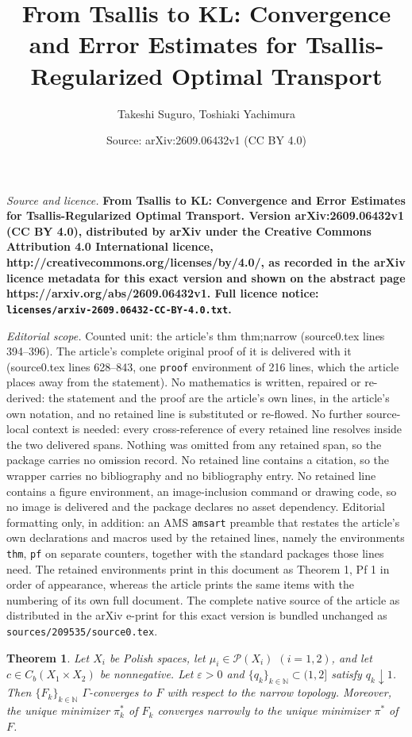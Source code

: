 \documentclass[10pt,a4paper]{amsart}
\title{\bf From Tsallis to KL: Convergence and Error Estimates for Tsallis-Regularized Optimal Transport}
\author{Takeshi Suguro, Toshiaki Yachimura}
\date{Source: arXiv:2609.06432v1 (CC BY 4.0)}
\newtheorem{thm}{Theorem}
\newcommand{\N}{\mathbb N}
\newcommand{\ep}{\varepsilon}
\begin{document}
\maketitle

\noindent\emph{Source and licence.} \bf From Tsallis to KL: Convergence and Error Estimates for Tsallis-Regularized Optimal Transport. Version arXiv:2609.06432v1 (CC BY 4.0), distributed by arXiv under the Creative Commons Attribution 4.0 International licence, http://creativecommons.org/licenses/by/4.0/, as recorded in the arXiv licence metadata for this exact version and shown on the abstract page https://arxiv.org/abs/2609.06432v1. Full licence notice: \texttt{licenses/arxiv-2609.06432-CC-BY-4.0.txt}.\par\smallskip

\noindent\textit{Editorial scope.} Counted unit: the article's thm thm;narrow (source0.tex lines 394--396). The article's complete original proof of it is delivered with it (source0.tex lines 628--843, one \texttt{proof} environment of 216 lines, which the article places away from the statement). No mathematics is written, repaired or re-derived: the statement and the proof are the article's own lines, in the article's own notation, and no retained line is substituted or re-flowed.  No further source-local context is needed: every cross-reference of every retained line resolves inside the two delivered spans.  Nothing was omitted from any retained span, so the package carries no omission record.  No retained line contains a citation, so the wrapper carries no bibliography and no bibliography entry.  No retained line contains a figure environment, an image-inclusion command or drawing code, so no image is delivered and the package declares no asset dependency.  Editorial formatting only, in addition: an AMS \texttt{amsart} preamble that restates the article's own declarations and macros used by the retained lines, namely the environments \texttt{thm}, \texttt{pf} on separate counters, together with the standard packages those lines need.  The retained environments print in this document as Theorem 1, Pf 1 in order of appearance, whereas the article prints the same items with the numbering of its own full document.  The complete native source of the article as distributed in the arXiv e-print for this exact version is bundled unchanged as \texttt{sources/209535/source0.tex}.
\begin{thm}\label{thm;narrow}
Let $X_i$ be Polish spaces, let $\mu_i\in\mathcal P(X_i)$ $(i=1,2)$, and let $c\in C_b(X_1\times X_2)$ be nonnegative. Let $\ep>0$ and $\{q_k\}_{k\in\N}\subset(1,2]$ satisfy $q_k\downarrow1$. Then $\{F_k\}_{k\in\N}$ $\Gamma$-converges to $F$ with respect to the narrow topology. Moreover, the unique minimizer $\pi_k^*$ of $F_k$ converges narrowly to the unique minimizer $\pi^*$ of $F$.
\end{thm}
\end{document}
